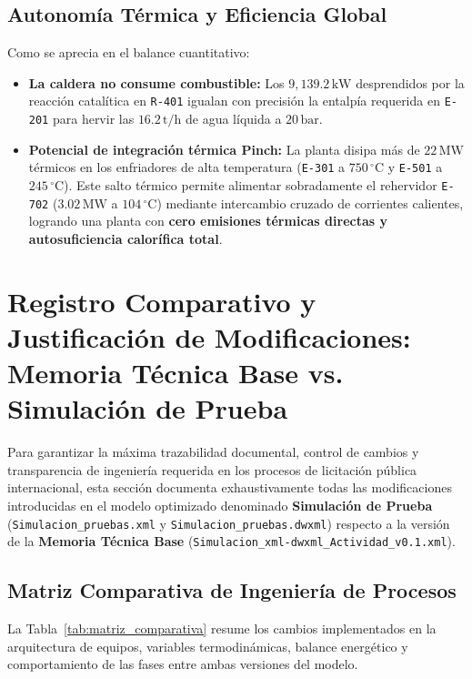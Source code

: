 \documentclass[11pt,a4paper]{article}
\begin{document}
\subsection{Autonomía Térmica y Eficiencia Global}
Como se aprecia en el balance cuantitativo:
\begin{itemize}
    \item \textbf{La caldera no consume combustible:} Los $9{,}139.2\,\text{kW}$ desprendidos por la reacción catalítica en \texttt{R-401} igualan con precisión la entalpía requerida en \texttt{E-201} para hervir las $16.2\,\text{t/h}$ de agua líquida a $20\,\text{bar}$.
    \item \textbf{Potencial de integración térmica Pinch:} La planta disipa más de $22\,\text{MW}$ térmicos en los enfriadores de alta temperatura (\texttt{E-301} a $750\,^\circ\text{C}$ y \texttt{E-501} a $245\,^\circ\text{C}$). Este salto térmico permite alimentar sobradamente el rehervidor \texttt{E-702} ($3.02\,\text{MW}$ a $104\,^\circ\text{C}$) mediante intercambio cruzado de corrientes calientes, logrando una planta con \textbf{cero emisiones térmicas directas y autosuficiencia calorífica total}.
\end{itemize}


\section{Registro Comparativo y Justificación de Modificaciones: Memoria Técnica Base vs. Simulación de Prueba}

Para garantizar la máxima trazabilidad documental, control de cambios y transparencia de ingeniería requerida en los procesos de licitación pública internacional, esta sección documenta exhaustivamente todas las modificaciones introducidas en el modelo optimizado denominado \textbf{Simulación de Prueba} (\texttt{Simulacion\_pruebas.xml} y \texttt{Simulacion\_pruebas.dwxml}) respecto a la versión de la \textbf{Memoria Técnica Base} (\texttt{Simulacion\_xml-dwxml\_Actividad\_v0.1.xml}).

\subsection{Matriz Comparativa de Ingeniería de Procesos}
La Tabla~\ref{tab:matriz_comparativa} resume los cambios implementados en la arquitectura de equipos, variables termodinámicas, balance energético y comportamiento de las fases entre ambas versiones del modelo.
\end{document}
